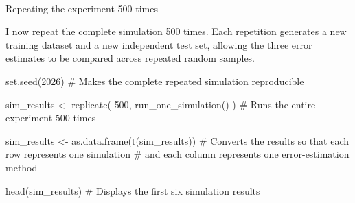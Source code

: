 \documentclass[
  letterpaper,
  DIV=11,
  numbers=noendperiod]{scrreprt}
\makeatletter
\let\oldparagraph\paragraph
\renewcommand{\paragraph}{
    \@ifstar
      \xxxParagraphStar
      \xxxParagraphNoStar
  }
\newcommand{\xxxParagraphStar}[1]{\oldparagraph*{#1}\mbox{}}
\newcommand{\xxxParagraphNoStar}[1]{\oldparagraph{#1}\mbox{}}
\newenvironment{Shaded}{\begin{snugshade}}{\end{snugshade}}
\newcommand{\AttributeTok}[1]{\textcolor[rgb]{0.40,0.45,0.13}{#1}}
\newcommand{\CommentTok}[1]{\textcolor[rgb]{0.37,0.37,0.37}{#1}}
\newcommand{\DecValTok}[1]{\textcolor[rgb]{0.68,0.00,0.00}{#1}}
\newcommand{\FunctionTok}[1]{\textcolor[rgb]{0.28,0.35,0.67}{#1}}
\newcommand{\NormalTok}[1]{\textcolor[rgb]{0.00,0.23,0.31}{#1}}
\newcommand{\OtherTok}[1]{\textcolor[rgb]{0.00,0.23,0.31}{#1}}
\newcommand{\SpecialCharTok}[1]{\textcolor[rgb]{0.37,0.37,0.37}{#1}}
\makeatother
\begin{document}
\begin{Shaded}
\end{Shaded}

\paragraph{Repeating the experiment 500
times}\label{repeating-the-experiment-500-times}

I now repeat the complete simulation 500 times. Each repetition
generates a new training dataset and a new independent test set,
allowing the three error estimates to be compared across repeated random
samples.

\begin{Shaded}
\begin{Highlighting}[]
\FunctionTok{set.seed}\NormalTok{(}\DecValTok{2026}\NormalTok{) }\CommentTok{\# Makes the complete repeated simulation reproducible}

\NormalTok{sim\_results }\OtherTok{\textless{}{-}} \FunctionTok{replicate}\NormalTok{(}
  \DecValTok{500}\NormalTok{,}
  \FunctionTok{run\_one\_simulation}\NormalTok{()}
\NormalTok{) }\CommentTok{\# Runs the entire experiment 500 times}

\NormalTok{sim\_results }\OtherTok{\textless{}{-}} \FunctionTok{as.data.frame}\NormalTok{(}\FunctionTok{t}\NormalTok{(sim\_results))}
\CommentTok{\# Converts the results so that each row represents one simulation}
\CommentTok{\# and each column represents one error{-}estimation method}

\FunctionTok{head}\NormalTok{(sim\_results) }\CommentTok{\# Displays the first six simulation results}
\end{Highlighting}
\end{Shaded}
\end{document}

